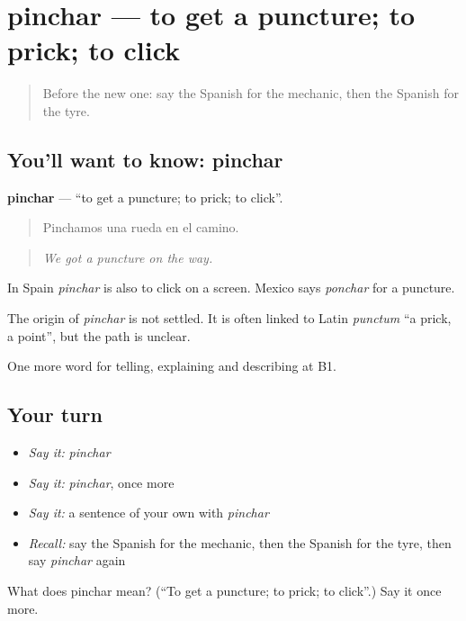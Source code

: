 \section[pinchar]{pinchar — to get a puncture; to prick; to click}

\label{lesson:ES-C645-pinchar}



\begin{quote}
Before the new one: say the Spanish for the mechanic, then the Spanish for the tyre.
\end{quote}

\subsection*{You'll want to know: pinchar}
\textbf{pinchar} — \textquotedblleft{}to get a puncture; to prick; to click\textquotedblright{}.

\begin{quote}
Pinchamos una rueda en el camino.
\end{quote}

\begin{quote}
\emph{We got a puncture on the way.}
\end{quote}

In Spain \emph{pinchar} is also to click on a screen. Mexico says \emph{ponchar} for a puncture.

\begin{cousinweb}
The origin of \emph{pinchar} is not settled. It is often linked to Latin \emph{punctum} \textquotedblleft{}a prick, a point\textquotedblright{}, but the path is unclear.
\end{cousinweb}

\begin{grammarlens}[title={What you've built}]
One more word for telling, explaining and describing at B1.
\end{grammarlens}

\subsection*{Your turn}
\begin{itemize}
\raggedright
  \item \emph{Say it:} \emph{pinchar}
  \item \emph{Say it:} \emph{pinchar}, once more
  \item \emph{Say it:} a sentence of your own with \emph{pinchar}
  \item \emph{Recall:} say the Spanish for the mechanic, then the Spanish for the tyre, then say \emph{pinchar} again
\end{itemize}

\begin{tcolorbox}[breakable,colback=teal!4,colframe=teal!35!black,title={Before you move on}]
What does pinchar mean? (\textquotedblleft{}To get a puncture; to prick; to click\textquotedblright{}.) Say it once more.
\end{tcolorbox}
